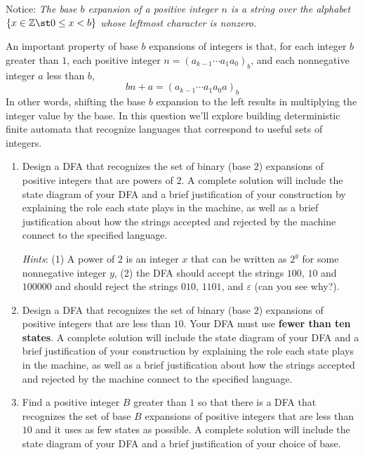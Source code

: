 \begin{enumerate}[wide, labelwidth=!, labelindent=0pt]
Notice: {\it The base $b$ expansion of a positive integer $n$ is a string over the alphabet 
$\{x \in \mathbb{Z} \st 0 \leq x < b\}$
whose leftmost character is nonzero.}

An important property of base $b$ expansions of integers is that, for each integer $b$ greater than $1$,
each positive integer $n = (a_{k-1} \cdots a_1 a_0)_b$, and each nonnegative integer $a$ less than $b$, 
\[
    bn + a = (a_{k-1} \cdots a_1 a_0a)_b
\]
In other words, shifting the base $b$ expansion to the left results in multiplying the integer value by the base.
In this question we'll explore building deterministic finite automata that recognize 
languages that correspond to useful sets of integers.

    \begin{enumerate}
    \item\gradeComplete Design a DFA that recognizes the set of binary (base $2$) expansions of 
    positive integers that are powers of $2$. A complete solution will include the state diagram of your DFA and 
    a brief justification 
    of your construction by explaining the role each state plays in the machine, as well as a brief 
    justification about how the strings accepted and rejected by the machine connect to the specified language.

    {\it Hints}: (1) A power of $2$ is an integer $x$ that can be written as $2^y$ for some nonnegative integer $y$, 
    (2) the DFA should accept the strings $100$, $10$ and $100000$ and should reject the 
    strings $010$, $1101$, and $\varepsilon$ (can you see why?).

    \item\gradeCorrect Design a DFA that recognizes the set of 
    binary (base $2$) expansions of positive integers that are less than $10$. Your DFA must use {\bf fewer than ten states}. 
    A complete solution will include the state diagram of your DFA and 
    a brief justification 
    of your construction by explaining the role each state plays in the machine, as well as a brief 
    justification about how the strings accepted and rejected by the machine connect to the specified language.

    \item \gradeComplete Find a positive integer $B$ greater than $1$ so that 
    there is a DFA that recognizes the set of 
    base $B$ expansions of positive integers that are less than $10$ and it 
    uses as few states as possible. A complete solution will include the state 
    diagram of your DFA and 
    a brief justification of your choice of base.
        


\end{enumerate}
\end{enumerate}
